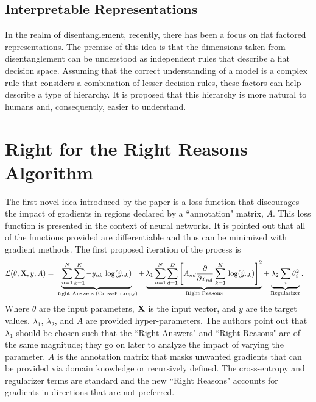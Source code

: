 \documentclass[twoside,11pt]{article}
\begin{document}
\subsection{Interpretable Representations}
In the realm of disentanglement, recently, there has been a focus on flat factored representations. The premise of this idea is that the dimensions taken from disentanglement can be understood as independent rules that describe a flat decision space. Assuming that the correct understanding of a model is a complex rule that considers a combination of lesser decision rules, these factors can help describe a type of hierarchy. It is proposed that this hierarchy is more natural to humans and, consequently, easier to understand.


\section{Right for the Right Reasons Algorithm}
\label{sec:RRR alg}
The first novel idea introduced by the paper is a loss function that discourages the impact of gradients in regions declared by a ``annotation" matrix, $A$. This loss function is presented in the context of neural networks. It is pointed out that all of the functions provided are differentiable and thus can be minimized with gradient methods. The first proposed iteration of the process is 
\begin{align}
\mathcal{L}(\theta, \vb{X}, y, A) &  = \underbrace{\sum^N_{n=1}\sum^K_{k=1}-y_{nk}\,\log(\hat{y}_{nk})}_\text{Right Answers (Cross-Entropy)} + \underbrace{\lambda_1 \sum^N_{n=1}\sum^D_{d=1}\left[A_{nd}\pdv{x_{nd}}\sum^K_{k=1}\, \log(\hat{y}_{nk})\right]^2}_\text{Right Reasons} + \underbrace{\lambda_2 \sum_i \theta^2_i}_\text{Regularizer}.
\label{fn:1}
\end{align}
Where $\theta$ are the input parameters, $\vb{X}$ is the input vector, and $y$ are the target values. $\lambda_1$, $\lambda_2$, and $A$ are provided hyper-parameters. The authors point out that $\lambda_1$ should be chosen such that the ``Right Answers" and ``Right Reasons" are of the same magnitude; they go on later to analyze the impact of varying the parameter. $A$ is the annotation matrix that masks unwanted gradients that can be provided via domain knowledge or recursively defined. The cross-entropy and regularizer terms are standard and the new ``Right Reasons" accounts for gradients in directions that are not preferred. 
\end{document}
